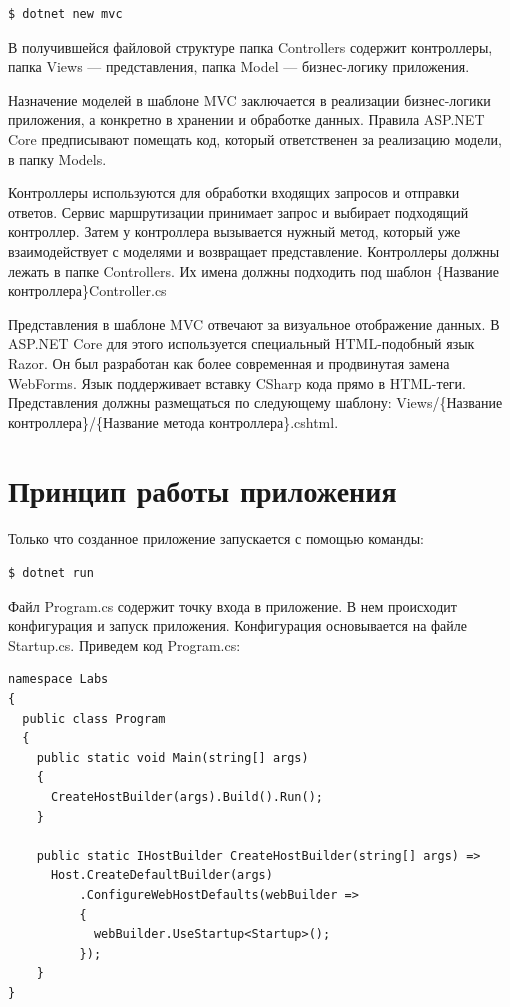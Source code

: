 \documentclass[a4paper,14pt]{extreport}
\begin{document}
\lstset{language=bash}
\begin{lstlisting}[basicstyle=\small]
$ dotnet new mvc
\end{lstlisting}

В получившейся файловой структуре папка Controllers содержит контроллеры, папка Views --- представления, папка Model --- бизнес-логику приложения.

Назначение моделей в шаблоне MVC заключается в реализации бизнес-логики приложения, а конкретно в хранении и обработке данных. Правила ASP.NET Core предписывают помещать код, который ответственен за реализацию модели, в папку Models.

Контроллеры используются для обработки входящих запросов и отправки ответов. Сервис маршрутизации принимает запрос и выбирает подходящий контроллер. Затем у контроллера вызывается нужный метод, который уже взаимодействует с моделями и возвращает представление. Контроллеры должны лежать в папке Controllers. Их имена должны подходить под шаблон \{Название контроллера\}Controller.cs

Представления в шаблоне MVC отвечают за визуальное отображение данных. В ASP.NET Core для этого используется специальный HTML-подобный язык Razor. Он был разработан как более современная и продвинутая замена WebForms. Язык поддерживает вставку CSharp кода прямо в HTML-теги. Представления должны размещаться по следующему шаблону: Views/\{Название контроллера\}/\{Название метода контроллера\}.cshtml.



\section{Принцип работы приложения}
Только что созданное приложение запускается с помощью команды:

\lstset{language=bash}
\begin{lstlisting}[basicstyle=\small]
$ dotnet run
\end{lstlisting}

Файл Program.cs содержит точку входа в приложение. В нем происходит конфигурация и запуск приложения. Конфигурация основывается на файле Startup.cs. Приведем код Program.cs:

\lstset{language=c++}
\begin{lstlisting}[basicstyle=\small]
namespace Labs
{
  public class Program
  {
    public static void Main(string[] args)
    {
      CreateHostBuilder(args).Build().Run();
    }
		
    public static IHostBuilder CreateHostBuilder(string[] args) =>
      Host.CreateDefaultBuilder(args)
          .ConfigureWebHostDefaults(webBuilder =>
		  {
		    webBuilder.UseStartup<Startup>();
		  });
	}
}
\end{lstlisting}
\end{document}
